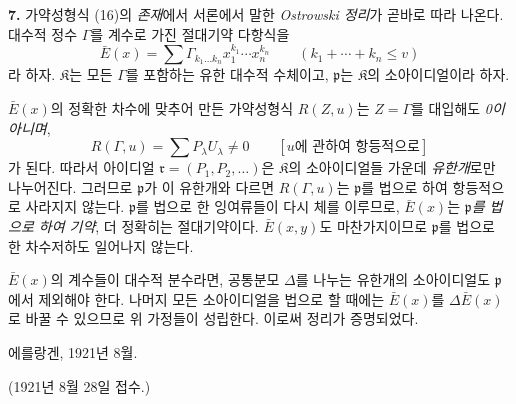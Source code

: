 \textbf{7.} 가약성형식 (16)의 \emph{존재}에서 서론에서 말한 \emph{Ostrowski 정리}가 곧바로 따라 나온다. 대수적 정수 \(\Gamma\)를 계수로 가진 절대기약 다항식을
\[
\bar E(x)=\sum \Gamma_{k_1\ldots k_n}x_1^{k_1}\cdots x_n^{k_n}
\qquad(k_1+\cdots+k_n\le v)
\]
라 하자. \(\mathfrak K\)는 모든 \(\Gamma\)를 포함하는 유한 대수적 수체이고, \(\mathfrak p\)는 \(\mathfrak K\)의 소아이디얼이라 하자.

\(\bar E(x)\)의 정확한 차수에 맞추어 만든 가약성형식 \(R(Z,u)\)는 \(Z=\Gamma\)를 대입해도 \emph{0이 아니며},
\[
R(\Gamma,u)=\sum P_\lambda U_\lambda\ne0
\qquad[u\text{에 관하여 항등적으로}]
\]
가 된다. 따라서 아이디얼 \(\mathfrak r=(P_1,P_2,\ldots)\)은 \(\mathfrak K\)의 소아이디얼들 가운데 \emph{유한개}로만 나누어진다. 그러므로 \(\mathfrak p\)가 이 유한개와 다르면 \(R(\Gamma,u)\)는 \(\mathfrak p\)를 법으로 하여 항등적으로 사라지지 않는다. \(\mathfrak p\)를 법으로 한 잉여류들이 다시 체를 이루므로, \(\bar E(x)\)는 \emph{\(\mathfrak p\)를 법으로 하여 기약}, 더 정확히는 절대기약이다. \(\bar E(x,y)\)도 마찬가지이므로 \(\mathfrak p\)를 법으로 한 차수저하도 일어나지 않는다.

\(\bar E(x)\)의 계수들이 대수적 분수라면, 공통분모 \(\Delta\)를 나누는 유한개의 소아이디얼도 \(\mathfrak p\)에서 제외해야 한다. 나머지 모든 소아이디얼을 법으로 할 때에는 \(\bar E(x)\)를 \(\Delta\bar E(x)\)로 바꿀 수 있으므로 위 가정들이 성립한다. 이로써 정리가 증명되었다.

\begin{flushleft}
에를랑겐, 1921년 8월.
\end{flushleft}
\begin{center}
(1921년 8월 28일 접수.)
\end{center}
